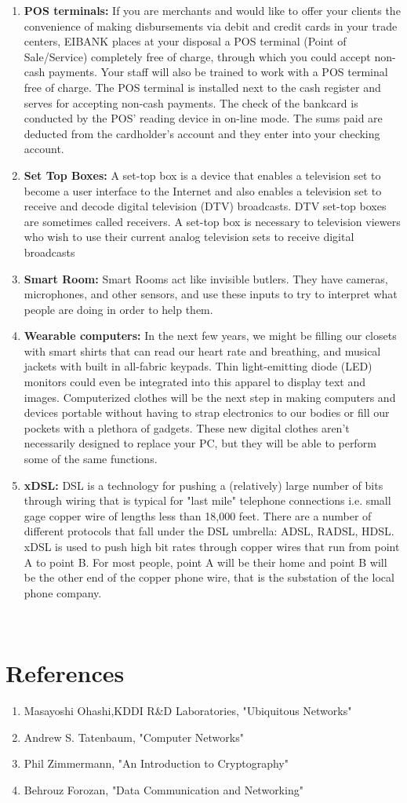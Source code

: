 \documentclass[12pt]{report}
\begin{document}
\begin{enumerate}
\item {\bf POS terminals:}  If you are merchants and would like to offer your clients the convenience of making disbursements via debit and credit cards in your trade centers, EIBANK places at your disposal a POS terminal (Point of Sale/Service) completely free of charge, through which you could accept non-cash payments. Your staff will also be trained to work with a POS terminal free of charge. The POS terminal is installed next to the cash register and serves for accepting non-cash payments. The check of the bankcard is conducted by the POS' reading device in on-line mode. The sums paid are deducted from the cardholder's account and they enter into your checking account.
\item {\bf Set Top Boxes:} A set-top box is a device that enables a television set to become a user interface to the Internet and also enables a television set to receive and decode digital television (DTV) broadcasts. DTV set-top boxes are sometimes called receivers. A set-top box is necessary to television viewers who wish to use their current analog television sets to receive digital broadcasts
\item {\bf Smart Room:} Smart Rooms act like invisible butlers. They have cameras, microphones, and other sensors, and use these inputs to try to interpret what people are doing in order to help them.
\item {\bf Wearable computers:} In the next few years, we might be filling our closets with smart shirts that can read our heart rate and breathing, and musical jackets with built in all-fabric keypads. Thin light-emitting diode (LED) monitors could even be integrated into this apparel to display text and images. Computerized clothes will be the next step in making computers and devices portable without having to strap electronics to our bodies or fill our pockets with a plethora of gadgets. These new digital clothes aren't necessarily designed to replace your PC, but they will be able to perform some of the same functions.
\item {\bf xDSL:}  DSL is a technology for pushing a (relatively) large number of bits through wiring that is typical for "last mile" telephone connections i.e. small gage copper wire of lengths less than 18,000 feet. There are a number of different protocols that fall under the DSL umbrella: ADSL, RADSL, HDSL. xDSL is used to push high bit rates through copper wires that run from point A to point B. For most people, point A will be their home and point B will be the other end of the copper phone wire, that is the substation of the local phone company.
\end{enumerate}\\


\chapter{References}
\begin{enumerate}\\
\item Masayoshi Ohashi,KDDI R&D Laboratories, "Ubiquitous Networks"
\item Andrew S. Tatenbaum, "Computer Networks"
\item Phil Zimmermann, "An Introduction to Cryptography"
\item Behrouz Forozan, "Data Communication and Networking"
\end{enumerate}
\end{document}
